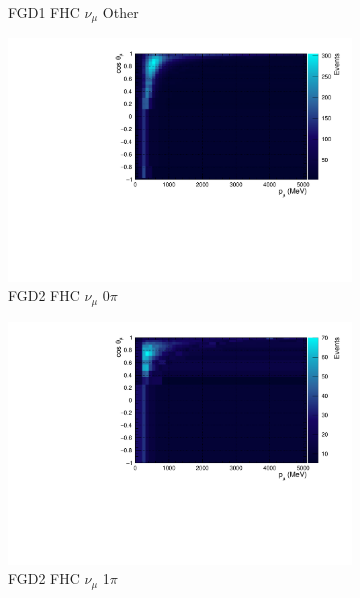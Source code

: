 \begin{figure}
\begin{subfigure}{.32\textwidth}
  \caption{FGD1 FHC $\nu_{\mu}$ Other}
  \label{fig:th2polynomFGD1_numuCC_other}
\end{subfigure}
\centering
\begin{subfigure}{.32\textwidth}
  \centering
  \includegraphics[width=0.95\linewidth]{figs/TH2PolyNom_MC_FGD2_numuCC_0pi}
  \caption{FGD2 FHC $\nu_{\mu}$ 0$\pi$}
  \label{fig:th2polynomFGD2_numuCC_0pi}
\end{subfigure}
\begin{subfigure}{.32\textwidth}
  \centering
  \includegraphics[width=0.95\linewidth]{figs/TH2PolyNom_MC_FGD2_numuCC_1pi}
  \caption{FGD2 FHC $\nu_{\mu}$ 1$\pi$}
  \label{fig:th2polynomFGD2_numuCC_1pi}
\end{subfigure}
\begin{subfigure}{.32\textwidth}
  \centering

\end{subfigure}
\end{figure}

